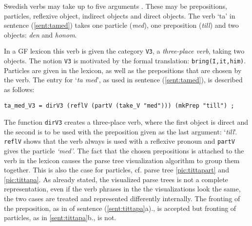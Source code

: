 \documentclass{report}
\begin{document}
Swedish verbs may take up to five arguments \cite[p. 53]{stymne}.
These may be prepositions, particles, reflexive object, indirect objects
and direct objects. 
The verb `ta' in sentence (\ref{sent:tamed}) takes one particle (\emph{med}),
one preposition (\emph{till}) and two objects: \emph{den} and \emph{honom}.

In a GF lexicon this verb is given the
category \verb-V3-, %
a \textit{three-place verb}, taking two objects.
The notion \verb-V3- is motivated by the formal translation: \verb-bring(I,it,him)-.\\
Particles are given in the lexicon, as well as the prepositions that are
chosen by the verb.
The entry for `\emph{ta med}', as used in sentence (\ref{sent:tamed}), is
described as follows:
\begin{verbatim}
ta_med_V3 = dirV3 (reflV (partV (take_V "med"))) (mkPrep "till") ;
\end{verbatim}
The function \verb-dirV3- creates a three-place verb, where the first object is direct and
the second is to be used with the preposition given as the last argument: `\emph{till}'.
\verb-reflV- shows that the verb always is used with a reflexive
pronoun and \verb-partV- gives the particle \emph{`med'}.
The fact that the chosen prepositions is attached to the verb in the lexicon
causes the parse tree visualization algorithm to group them together.
This is also the case for particles, cf. parse tree \ref{pic:tittapart}
and \ref{pic:tittapa}.
As already stated, the visualized parse trees is not a complete representation,
even if the verb phrases in the the visualizations look the same, the two cases
are treated and represented differently internally. The fronting of the
preposition, as in of sentence (\ref{sent:tittapa}a)., is accepted but
fronting of particles, as in \ref{sent:tittapa}b., is not.
\end{document}
